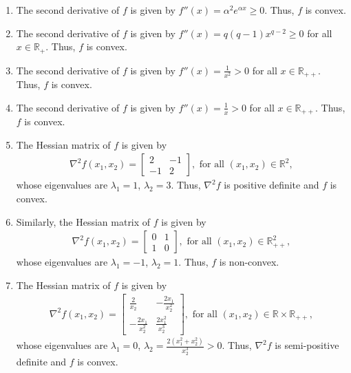\documentclass[a4paper]{article}
\numberwithin{equation}{section}
\begin{document}
\begin{enumerate}
\item The second derivative of $f$ is given by $f''\left( x \right) = {\alpha ^2}{e^{\alpha x}} \ge 0$. Thus, $f$ is convex.
\item The second derivative of $f$ is given by $f''\left( x \right) = q\left( {q - 1} \right){x^{q - 2}} \ge 0$ for all $x\in \mathbb{R}_+$. Thus, $f$ is convex.
\item The second derivative of $f$ is given by $f''\left( x \right) = \frac{1}{{{x^2}}} >0$ for all $x\in \mathbb{R}_{++}$. Thus, $f$ is convex.
\item The second derivative of $f$ is given by $f''\left( x \right) = \frac{1}{x} > 0$ for all $x\in \mathbb{R}_{++}$. Thus, $f$ is convex.
\item The Hessian matrix of $f$ is given by
\begin{align}
{\nabla ^2}f\left( {{x_1},{x_2}} \right) = \left[ {\begin{array}{*{20}{c}}
2&{ - 1}\\
{ - 1}&2
\end{array}} \right], \mbox{ for all }\left(x_1,x_2\right)\in \mathbb{R}^2,
\end{align}
whose eigenvalues are $\lambda _1=1$, $\lambda _2 = 3$. Thus, ${\nabla ^2}f$ is positive definite and $f$ is convex.
\item Similarly, the Hessian matrix of $f$ is given by
\begin{align}
{\nabla ^2}f\left( {{x_1},{x_2}} \right) = \left[ {\begin{array}{*{20}{c}}
0&1\\
1&0
\end{array}} \right], \mbox{ for all }\left(x_1,x_2\right)\in \mathbb{R}_{++}^2,
\end{align}
whose eigenvalues are $\lambda _1=-1$, $\lambda _2 = 1$. Thus, $f$ is non-convex.
\item The Hessian matrix of $f$ is given by
\begin{align}
{\nabla ^2}f\left( {{x_1},{x_2}} \right) = \left[ {\begin{array}{*{20}{c}}
{\frac{2}{{{x_2}}}}&{ - \frac{{2{x_1}}}{{x_2^2}}}\\
{ - \frac{{2{x_1}}}{{x_2^2}}}&{\frac{{2x_1^2}}{{x_2^3}}}
\end{array}} \right], \mbox{ for all } \left( {{x_1},{x_2}} \right) \in \mathbb{R} \times {\mathbb{R}_{ +  + }},
\end{align}
whose eigenvalues are $\lambda _1=0$, ${\lambda _2} = \frac{{2\left( {x_1^2 + x_2^2} \right)}}{{x_2^3}} >0$. Thus, ${\nabla ^2}f$ is semi-positive definite and $f$ is convex.

\end{enumerate}
\end{document}
